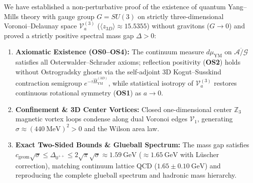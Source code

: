 \documentclass[11pt, a4paper]{article}
\theoremstyle{definition}
\theoremstyle{remark}
\begin{document}
We have established a non-perturbative proof of the existence of quantum Yang--Mills theory with gauge group $G = SU(3)$ on strictly three-dimensional Voronoi--Delaunay space $\mathcal{V}_{a}^{(3)}$ ($\langle z_{3D} \rangle \approx 15.5355$) without gravitons ($G \to 0$) and proved a strictly positive spectral mass gap $\Delta > 0$:
\begin{enumerate}
  \item \textbf{Axiomatic Existence (OS0--OS4):} The continuum measure $d\mu_{\mathrm{YM}}$ on $\overline{\mathcal{A}/\mathcal{G}}$ satisfies all Osterwalder--Schrader axioms; reflection positivity (\textbf{OS2}) holds without Ostrogradsky ghosts via the self-adjoint 3D Kogut--Susskind contraction semigroup $e^{-\tau\hat{H}_{\mathrm{YM}}^{(3D)}}$, while statistical isotropy of $\mathcal{V}_{a}^{(3)}$ restores continuous rotational symmetry (\textbf{OS1}) as $a \to 0$.
  \item \textbf{Confinement \& 3D Center Vortices:} Closed one-dimensional center $\mathbb{Z}_{3}$ magnetic vortex loops condense along dual Voronoi edges $\mathcal{V}_{1}$, generating $\sigma \approx (440~\mathrm{MeV})^{2} > 0$ and the Wilson area law.
  \item \textbf{Exact Two-Sided Bounds \& Glueball Spectrum:} The mass gap satisfies $c_{\mathrm{geom}}\sqrt{\sigma} \le \Delta_{0^{++}} \le 2\sqrt{\pi}\sqrt{\sigma} \approx 1.59~\mathrm{GeV}$ ($\approx 1.65~\mathrm{GeV}$ with L\"uscher correction), matching continuum lattice QCD ($1.65 \pm 0.10~\mathrm{GeV}$) and reproducing the complete glueball spectrum and hadronic mass hierarchy.
\end{enumerate}
\end{document}
